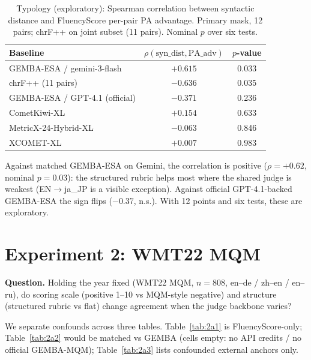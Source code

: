 \documentclass[11pt]{article}
\newcommand{\FS}{FluencyScore}
\begin{document}
\begin{table}[t]
\centering
\scriptsize
\caption{Typology (exploratory): Spearman correlation between syntactic distance and \FS{} per-pair PA advantage. Primary mask, 12 pairs; chrF++ on joint subset (11 pairs). Nominal $p$ over six tests.}
\label{tab:1d}
\begin{tabularx}{\columnwidth}{>{\raggedright\arraybackslash}Xcc}
\toprule
Baseline & $\rho(\mathrm{syn\_dist},\mathrm{PA\_adv})$ & $p$-value \\
\midrule
GEMBA-ESA / gemini-3-flash & $+0.615$ & 0.033 \\
chrF++ (11 pairs) & $-0.636$ & 0.035 \\
GEMBA-ESA / GPT-4.1 (official) & $-0.371$ & 0.236 \\
CometKiwi-XL & $+0.154$ & 0.633 \\
MetricX-24-Hybrid-XL & $-0.063$ & 0.846 \\
XCOMET-XL & $+0.007$ & 0.983 \\
\bottomrule
\end{tabularx}

\end{table}


Against matched GEMBA-ESA on Gemini, the correlation is positive
($\rho{=}{+}0.62$, nominal $p{=}0.03$): the structured rubric helps most where
the shared judge is weakest (EN$\to$ja\_JP is a visible exception).
Against official GPT-4.1-backed GEMBA-ESA the sign flips ($-0.37$, n.s.).
With 12 points and six tests, these are exploratory.

\section{Experiment 2: WMT22 MQM}
\label{sec:exp2}
\textbf{Question.}
Holding the year fixed (WMT22 MQM, $n{=}808$, en--de / zh--en / en--ru), do
scoring scale (positive 1--10 vs MQM-style negative) and structure (structured
rubric vs flat) change agreement when the judge backbone varies?

We separate confounds across three tables.
Table~\ref{tab:2a1} is \FS{}-only;
Table~\ref{tab:2a2} would be matched vs GEMBA (cells empty: no API credits / no
official GEMBA-MQM);
Table~\ref{tab:2a3} lists confounded external anchors only.
\end{document}
